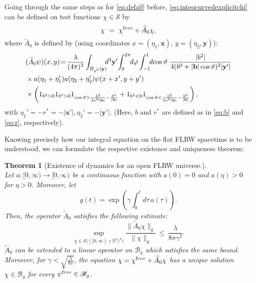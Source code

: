\documentclass[b5paper,draft,openbib,12pt]{memoir}
\newtheorem{Thm}[Def]{Theorem}
\newcommand{\R}{\mathbb{R}}
\newcommand{\vx}{\mathbf{x}}
\newcommand{\vy}{\mathbf{y}}
\newcommand{\vb}{\mathbf{b}}
\newcommand{\free}{{\textup free}}
\newcommand{\Banach}{\mathscr{B}}
\begin{document}
Going through the same steps as for \eqref{eq:defa0} 
before, \eqref{eq:inteqcurvedexplicitchi} can be 
defined on test functions $\chi \in \mathcal{S}$ by
\begin{equation}
	\chi ~=~ \chi^\free + \widetilde{A}_0 \chi,
\label{eq:inteqcurvedabstract}
\end{equation}
where $\widetilde{A}_0$ is defined by (using 
coordinates $x=(\eta_1,\vx)$, $y=(\eta_2,\vy)$):
\begin{align}\nonumber
    &(\widetilde{A}_0\psi)(x,y)\!=\!\frac{\lambda}{(4\pi)^3}\int_{B_{y^0}(\vy)}\!\!\!d^3\vy'  \!\int_0^{2\pi}\!\!d\varphi \int_{-1}^{1} \!\!d\!\cos\vartheta ~\frac{|b^2|}{4(b^0+|\vb|\cos\vartheta)^2 |\vy'|}  \\
    &\times a(\eta_1+\eta_1') a(\eta_2+\eta_2') \psi(x+x',y+y')\notag\\ 
    &\times \left(1_{b^2>0}1_{b^0>0} 1_{\cos\vartheta > \frac{b^2}{2x^0|\vb|} - \frac{b^0}{|\vb|}}+1_{b^2<0}1_{\cos\vartheta<\frac{b^2}{2x^0|\vb|} - \frac{b^0}{|\vb|}}\right),
\label{eq:defa0tilde}
\end{align}
with \(\eta_1'=-r^*=-|\vx'| , \eta_2'=-|\vy'|\). 
(Here, $b$ and $r^*$ are defined as in \eqref{eq:b} 
and \eqref{eq:r}, respectively).

Knowing precisely how our integral equation on the 
flat FLRW spacetime is to be understood, we can 
formulate the respective existence and uniqueness 
theorem:

\begin{Thm}[Existence of dynamics for an open FLRW 
  universe.]
	\label{thm:existencecurved}~\\
  Let $a: [0,\infty) \rightarrow [0,\infty)$ be a 
  continuous function with $a(0)=0$ and $a(\eta)>0$ 
  for $\eta>0$. Moreover, let
	\begin{equation}
		g(t) = \exp \left( \gamma \int_0^t d\tau \, a(\tau) \right).
	\end{equation}
  Then, the operator $\widetilde{A}_0$ satisfies the 
  following estimate:
	\begin{equation}
		\sup_{\chi \in \mathcal{S}\big( ([0,\infty)\times \R^3)^2\big)} \frac{\| \widetilde{A}_0 \chi \|_g}{\| \chi \|_g} ~\leq~ \frac{\lambda}{8\pi \gamma^2}.
	\label{eq:a0tildebound}
	\end{equation}
  $\widetilde{A}_0$ can be extended to a linear 
  operator on $\Banach_g$ which satisfies the same 
  bound. Moreover, for $\gamma < 
  \sqrt{\frac{\lambda}{8\pi}}$, the equation 
  $\chi = \chi^\free + \widetilde{A}_0\chi$ has a 
  unique solution $\chi \in \Banach_g$ for every 
  $\psi^\free \in \Banach_g$.
\end{Thm}
\end{document}
